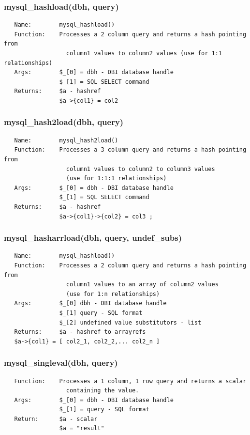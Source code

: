 \documentclass{article}
\begin{document}
\subsubsection*{mysql\_hashload(dbh, query)\label{pibase_pm_mysql_hashload_dbh_query_}}
\begin{verbatim}
   Name:        mysql_hashload()
   Function:    Processes a 2 column query and returns a hash pointing from
                  column1 values to column2 values (use for 1:1 relationships)
   Args:        $_[0] = dbh - DBI database handle
                $_[1] = SQL SELECT command
   Returns:     $a - hashref
                $a->{col1} = col2
\end{verbatim}
\subsubsection*{mysql\_hash2load(dbh, query)\label{pibase_pm_mysql_hash2load_dbh_query_}}
\begin{verbatim}
   Name:        mysql_hash2load()
   Function:    Processes a 3 column query and returns a hash pointing from
                  column1 values to column2 to column3 values
                  (use for 1:1:1 relationships)
   Args:        $_[0] = dbh - DBI database handle
                $_[1] = SQL SELECT command
   Returns:     $a - hashref
                $a->{col1}->{col2} = col3 ;
\end{verbatim}
\subsubsection*{mysql\_hasharrload(dbh, query, undef\_subs)\label{pibase_pm_mysql_hasharrload_dbh_query_undef_subs_}}
\begin{verbatim}
   Name:        mysql_hashload()
   Function:    Processes a 2 column query and returns a hash pointing from
                  column1 values to an array of column2 values
                  (use for 1:n relationships)
   Args:        $_[0] dbh - DBI database handle
                $_[1] query - SQL format
                $_[2] undefined value substitutors - list
   Returns:     $a - hashref to arrayrefs
   $a->{col1} = [ col2_1, col2_2,... col2_n ]
\end{verbatim}
\subsubsection*{mysql\_singleval(dbh, query)\label{pibase_pm_mysql_singleval_dbh_query_}}
\begin{verbatim}
   Function:    Processes a 1 column, 1 row query and returns a scalar
                  containing the value.
   Args:        $_[0] = dbh - DBI database handle
                $_[1] = query - SQL format
   Return:      $a - scalar
                $a = "result"
\end{verbatim}
\end{document}
